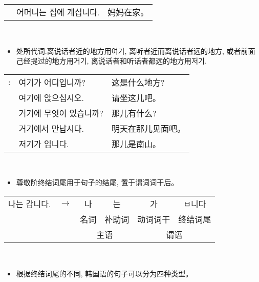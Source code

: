 \begin{grammar}
\begin{grammarsect}[\kr -에]
\begin{tabular}{lll}
			                 & \kr 어머니는 집에 계십니다.                        & 妈妈在家。   \\
		\end{tabular}\\
	\end{grammarsect}
	\begin{grammarsect}[\kr 여기, 거기, 저기]
		\begin{itemize}
			\item 处所代词.离说话者近的地方用{\kr 여기}, 离听者近而离说话者远的地方, 或者前面己经提过的地方用{\kr 거기}, 离说话者和听话者都远的地方用{\kr 저기}.
		\end{itemize}
		\begin{tabular}{lll}
			\kr \ruby{例}{예}: & \kr  여기가 어디입니까?              & 这是什么地方?   \\
			                 & \kr 여기에 앉으십시오.               & 请坐这儿吧。    \\
			                 & \kr 거기에 무엇이 있습니까?            & 那儿有什么?    \\
			                 & \kr \ruby{來日}{내일} 거기에서 만납시다. & 明天在那儿见面吧。 \\
			                 & \kr 저기가 \ruby{南山}{남산}입니다.    & 那儿是南山。
		\end{tabular}\\
	\end{grammarsect}
	\begin{grammarsect}[尊敬阶终结词尾]\label{grm:ref}
		\begin{itemize}
			\item 尊敬阶终结词尾用于句子的结尾, 置于谓词词干后。
		\end{itemize}
		\begin{tabular}{llcccc}
			\kr 나는 갑니다. & $\to $ & \kr 나                  & \kr 는                  & \kr 가 & \kr ㅂ니다 \\
			            &        & 名词                     & 补助词                    & 动词词干  & 终结词尾    \\\cmidrule(r){3-4} \cmidrule(l){5-6}
			            &        & \multicolumn{2}{c}{主语} & \multicolumn{2}{c}{谓语}
		\end{tabular}\\
		\begin{itemize}
			\item 根据终结词尾的不同, 韩国语的句子可以分为四种类型。
		\end{itemize}
		\begin{tabular}{|c|c|c|c|c|}\hline

\end{tabular}
\end{grammarsect}
\end{grammar}
